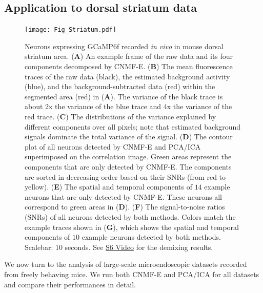 \documentclass[9pt,lineno]{elife}
\begin{document}
\subsection{Application to dorsal striatum data}

\begin{figure}[!t]
  \centering
  \texttt{[image: Fig\_Striatum.pdf]}
  \caption{Neurons expressing GCaMP6f recorded \emph{in vivo} in mouse dorsal striatum area. (\textbf{A}) An example frame of the raw data and its four components decomposed by CNMF-E. (\textbf{B}) The mean fluorescence traces of the raw data (black), the estimated background activity (blue), and the background-subtracted data (red) within the segmented area (red) in (\textbf{A}). The variance of the black trace is about 2x the variance of the blue trace and 4x the variance of the red trace.  (\textbf{C}) The distributions of the variance explained by different components over all pixels; note that estimated background signals dominate the total variance of the signal. (\textbf{D}) The contour plot of all neurons detected by CNMF-E and PCA/ICA superimposed on the correlation image. Green areas represent the components that are only detected by CNMF-E. The components are sorted in decreasing order based on their SNRs (from red to yellow). (\textbf{E})  The spatial and temporal components of $14$ example neurons that are only detected by CNMF-E. These neurons all correspond to green areas in (\textbf{D}). (\textbf{F}) The signal-to-noise ratios (SNRs) of all neurons detected by both methods. Colors match the example traces shown in (\textbf{G}), which shows the spatial and temporal components of $10$ example neurons detected by both methods. Scalebar: $10$ seconds. See \href{http://www.columbia.edu/~pz2230/videos/striatum_demixing.mp4}{S6 Video} for the demixing results. } 
  \label{fig:dorsal_striatum}
\end{figure}

We now turn to the analysis of large-scale microendoscopic datasets recorded from freely behaving mice. We run both CNMF-E and PCA/ICA for all datasets and compare their performances in detail. 
\end{document}
